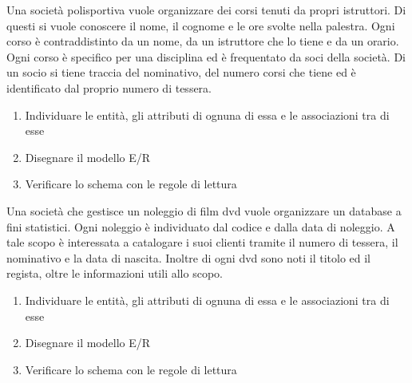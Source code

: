 \documentclass[addpoints]{exam}
\begin{document}
 
\begin{center}
\end{center}
 
\vspace{5mm}
 
 
\vspace{5mm}
 
 
\begin{questions}
	
\question[5] 	Una società polisportiva vuole organizzare dei corsi tenuti da propri istruttori. Di questi si vuole conoscere il nome, il cognome e le ore svolte nella palestra. Ogni corso è contraddistinto da un nome, da un istruttore che lo tiene e da un orario. Ogni corso è specifico per una disciplina ed è frequentato da soci della società. Di un socio si tiene traccia del nominativo, del numero corsi che tiene ed è identificato dal proprio numero di tessera.
\begin{enumerate}
	\item Individuare le entità, gli attributi di ognuna di essa e le associazioni tra di esse
	\item Disegnare il modello E/R
	\item Verificare lo schema con le regole di lettura
\end{enumerate}
 
\question[5] 		Una società che gestisce un noleggio di film dvd vuole organizzare un database a fini statistici. Ogni noleggio è individuato dal codice e dalla data di noleggio. A tale scopo è interessata a catalogare i suoi clienti tramite il numero di tessera, il nominativo e la data di nascita. Inoltre di ogni dvd sono noti il titolo ed il regista, oltre le informazioni utili allo scopo.
\begin{enumerate}
	\item Individuare le entità, gli attributi di ognuna di essa e le associazioni tra di esse
	\item Disegnare il modello E/R
	\item Verificare lo schema con le regole di lettura
\end{enumerate}

\end{questions}

\begin{center}
	\gradetable[h][questions]
\end{center}
\end{document}
